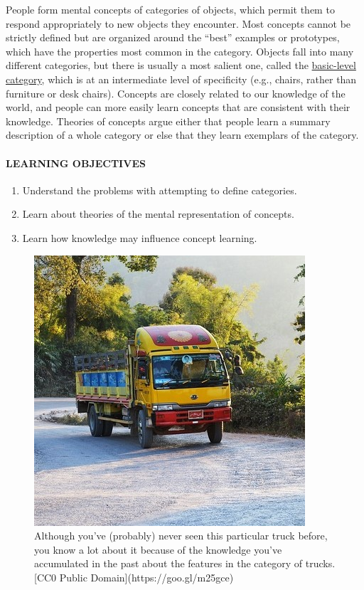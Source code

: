 \documentclass[
]{krantz}
\providecommand{\tightlist}{%
  \setlength{\itemsep}{0pt}\setlength{\parskip}{0pt}}
\begin{document}
People form mental concepts of categories of objects, which permit them to respond appropriately to new objects they encounter. Most concepts cannot be strictly defined but are organized around the ``best'' examples or prototypes, which have the properties most common in the category. Objects fall into many different categories, but there is usually a most salient one, called the \protect\hyperlink{basic-level-category}{basic-level category}, which is at an intermediate level of specificity (e.g., chairs, rather than furniture or desk chairs). Concepts are closely related to our knowledge of the world, and people can more easily learn concepts that are consistent with their knowledge. Theories of concepts argue either that people learn a summary description of a whole category or else that they learn exemplars of the category.

\hypertarget{learning-objectives-6}{%
\paragraph*{LEARNING OBJECTIVES}\label{learning-objectives-6}}

\begin{enumerate}
\def\labelenumi{\arabic{enumi}.}
\tightlist
\item
  Understand the problems with attempting to define categories.
\item
  Learn about theories of the mental representation of concepts.
\item
  Learn how knowledge may influence concept learning.
\end{enumerate}

\begin{figure}

{\centering \includegraphics[width=0.5\linewidth]{images/ch7/truck} 

}

\caption{Although you’ve (probably) never seen this particular truck before, you know a lot about it because of the knowledge you’ve accumulated in the past about the features in the category of trucks. [CC0 Public Domain](https://goo.gl/m25gce)}\label{fig:truck}
\end{figure}
\end{document}
